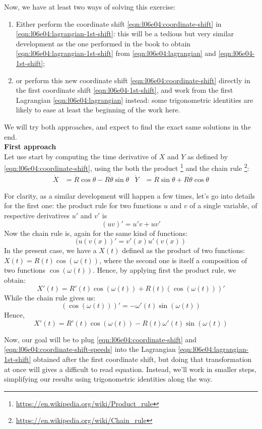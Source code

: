 \documentclass[solutions.tex]{subfiles}
\begin{document}
Now, we have at least two ways of solving this exercise:
\begin{enumerate}
	\item Either perform the coordinate shift \eqref{eqn:l06e04:coordinate-shift}
	in \eqref{eqn:l06e04:lagrangian-1st-shift}: this will be a tedious
	but very similar development as the one performed in the book to obtain
	\eqref{eqn:l06e04:lagrangian-1st-shift} from \eqref{eqn:l06e04:lagrangian}
	and \eqref{eqn:l06e04-1st-shift};
	\item or perform this new coordinate shift \eqref{eqn:l06e04:coordinate-shift}
	directly in the first coordinate shift \eqref{eqn:l06e04-1st-shift}, and
	work from the first Lagrangian \eqref{eqn:l06e04:lagrangian} instead: some
	trigonometric identities are likely to ease at least the beginning of the
	work here.
\end{enumerate}
We will try both approaches, and expect to find the exact same solutions in
the end. \\
\hr
\textbf{First approach}\\
Let use start by computing the time derivative of $X$ and $Y$ as defined
by \eqref{eqn:l06e04:coordinate-shift}, using the both the product
\footnote{\url{https://en.wikipedia.org/wiki/Product\_rule}}
and the chain rule
\footnote{\url{https://en.wikipedia.org/wiki/Chain\_rule}}:
\begin{align}
	\dot{X} &= \dot{R}\cos\theta - R\dot\theta\sin\theta
	& \dot{Y} &= \dot{R}\sin\theta + R\dot\theta\cos\theta
	\label{eqn:l06e04:coordinate-shift-speeds}
\end{align}

\begin{remark} For clarity, as a similar development will happen
a few times, let's go into details for the first one:
the product rule for two functions $u$ and $v$ of a single variable, of
respective derivatives $u'$ and $v'$ is
\[ (u v)' = u'v+uv' \]
Now the chain rule is, again for the same kind of functions:
\[ (u(v(x))' = v'(x)u'(v(x)) \]
In the present case, we have a $X(t)$ defined as the product of two
functions: $X(t) = R(t)\cos(\omega(t))$, where the second one is
itself a composition of two functions $\cos(\omega(t))$. Hence,
by applying first the product rule, we obtain:
\[
	X'(t) = R'(t)\cos(\omega(t)) + R(t)\left(\cos(\omega(t))\right)'
\]
While the chain rule gives us:
\[
	(\cos(\omega(t)))' = -\omega'(t)\sin(\omega(t))
\]
Hence,
\[
	X'(t) = R'(t)\cos(\omega(t)) - R(t)\omega'(t)\sin(\omega(t))
\]
\end{remark}
Now, our goal will be to plug \eqref{eqn:l06e04:coordinate-shift} and
\eqref{eqn:l06e04:coordinate-shift-speeds} into the Lagrangian
\eqref{eqn:l06e04:lagrangian-1st-shift} obtained after the first
coordinate shift, but doing that transformation at once will gives
a difficult to read equation. Instead, we'll work in smaller steps,
simplifying our results using trigonometric identities along the way. \\
\end{document}
